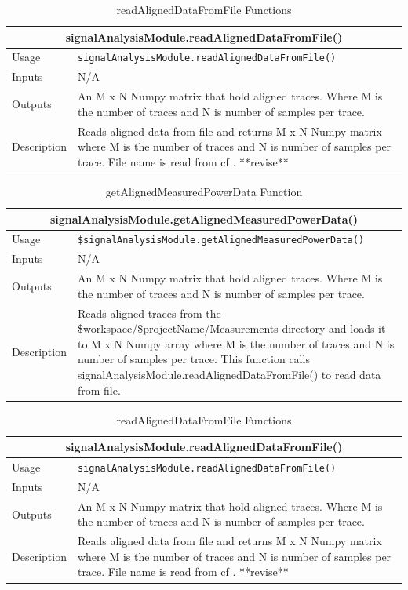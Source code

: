 \documentclass{llncs}
\numberwithin{algorithm}{chapter}
\begin{document}
\begin{table}
\caption{readAlignedDataFromFile Functions}
\begin{tabular}{ |p{2cm}||p{11cm}|  }
 \hline
 \multicolumn{2}{|c|}{\cellcolor{teal}\textbf{signalAnalysisModule.readAlignedDataFromFile()}} \\
 \hline
 Usage & \texttt{signalAnalysisModule.readAlignedDataFromFile()}\\ \hline
 Inputs & N/A \\ \hline
 Outputs & An M x N Numpy matrix that hold aligned traces. Where M is the number of traces and N is number of samples per trace.\\ \hline
 Description & Reads aligned data from file and returns M x N Numpy matrix where M is the number of traces and N is number of samples per trace. 
 File name is read from cf . **revise**\\ \hline
\end{tabular}
\end{table}

\begin{table}
\caption{getAlignedMeasuredPowerData Function}
\begin{tabular}{ |p{2cm}||p{11cm}|  }
 \hline
 \multicolumn{2}{|c|}{\cellcolor{teal}\textbf{signalAnalysisModule.getAlignedMeasuredPowerData()}} \\
 \hline
 Usage & \texttt{\$signalAnalysisModule.getAlignedMeasuredPowerData()}\\ \hline
 Inputs & N/A \\ \hline
 Outputs & An M x N Numpy matrix that hold aligned traces. Where M is the number of traces and N is number of samples per trace.\\ \hline
 Description & Reads aligned traces from the \$workspace/\$projectName/Measurements directory and loads it to M x N Numpy array where M is the number of traces and N is number of samples per trace.
This function calls signalAnalysisModule.readAlignedDataFromFile() to read data from file. \\ \hline
\end{tabular}
\end{table}

\begin{table}
\caption{readAlignedDataFromFile Functions}
\begin{tabular}{ |p{2cm}||p{11cm}|  }
 \hline
 \multicolumn{2}{|c|}{\cellcolor{teal}\textbf{signalAnalysisModule.readAlignedDataFromFile()}} \\
 \hline
 Usage & \texttt{signalAnalysisModule.readAlignedDataFromFile()}\\ \hline
 Inputs & N/A \\ \hline
 Outputs & An M x N Numpy matrix that hold aligned traces. Where M is the number of traces and N is number of samples per trace.\\ \hline
 Description & Reads aligned data from file and returns M x N Numpy matrix where M is the number of traces and N is number of samples per trace. 
 File name is read from cf . **revise**\\ \hline
\end{tabular}
\end{table}
\end{document}

